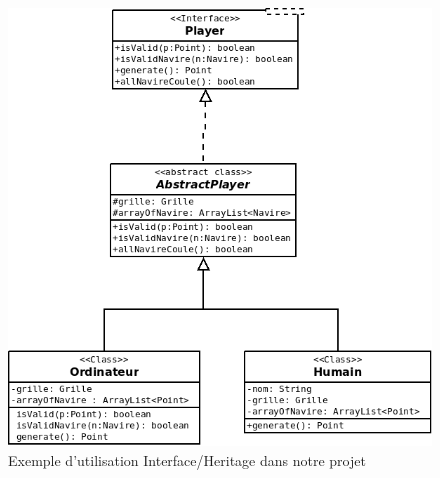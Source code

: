 \documentclass{rapport}
\begin{document}
{\begin{figure}[h]
\centering
\includegraphics[scale=0.3]{images/api.png}
\caption{Exemple d'utilisation Interface/Heritage dans notre projet }
\end{figure}
}
\end{document}
